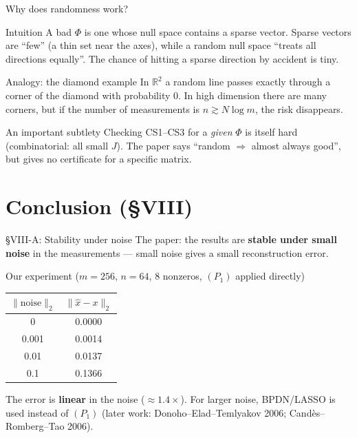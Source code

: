 \documentclass[aspectratio=169,11pt]{beamer}
\newcommand{\norm}[1]{\lVert #1\rVert}
\begin{document}
\begin{frame}{Why does randomness work?}
  \begin{block}{Intuition}
    A bad $\Phi$ is one whose null space contains a sparse vector. Sparse vectors are ``few'' (a thin set near the axes), while a random null space ``treats all directions equally''.
    The chance of hitting a sparse direction by accident is tiny.
  \end{block}
  \begin{exampleblock}{Analogy: the diamond example}
    In $\mathbb{R}^2$ a random line passes exactly through a corner of the diamond with probability 0. In high dimension there are many corners, but if the number of measurements is $n\gtrsim N\log m$, the risk disappears.
  \end{exampleblock}
  \begin{alertblock}{An important subtlety}
    Checking CS1--CS3 for a \emph{given} $\Phi$ is itself hard (combinatorial: all small $J$). The paper says ``random $\Rightarrow$ almost always good'', but gives no certificate for a specific matrix.
  \end{alertblock}
\end{frame}

\section{Conclusion (\S VIII)}

\begin{frame}{\S VIII-A: Stability under noise}
  The paper: the results are \textbf{stable under small noise} in the measurements --- small noise gives a small reconstruction error.
  \begin{exampleblock}{Our experiment ($m=256$, $n=64$, 8 nonzeros, $(P_1)$ applied directly)}
    \centering
    \begin{tabular}{@{}cc@{}}
      \toprule
      $\norm{\text{noise}}_2$ & $\norm{\hat x-x}_2$ \\
      \midrule
      0 & 0.0000 \\
      0.001 & 0.0014 \\
      0.01 & 0.0137 \\
      0.1 & 0.1366 \\
      \bottomrule
    \end{tabular}
  \end{exampleblock}
  The error is \textbf{linear} in the noise ($\approx1.4\times$). For larger noise, BPDN/LASSO is used instead of $(P_1)$
  (later work: Donoho--Elad--Temlyakov 2006; Cand\`es--Romberg--Tao 2006).
\end{frame}
\end{document}
